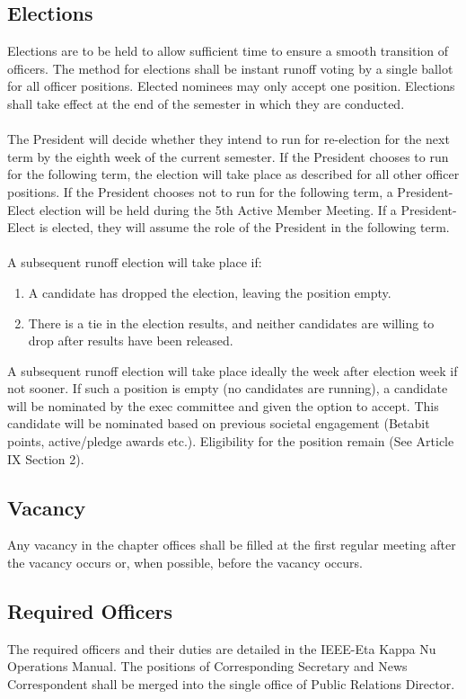 \documentclass[10pt, oneside]{article}
\begin{document}
\subsection{Elections}
Elections are to be held to allow sufficient time to ensure a smooth transition of officers. The method for elections shall be instant runoff voting by a single ballot for all officer positions. Elected nominees may only accept one position. Elections shall take effect at the end of the semester in which they are conducted.
\\~\\
The President will decide whether they intend to run for re-election for the next term by the eighth week of the current semester. If the President chooses to run for the following term, the election will take place as described for all other officer positions. If the President chooses not to run for the following term, a President-Elect election will be held during the 5th Active Member Meeting. If a President-Elect is elected, they will assume the role of the President in the following term.
\\~\\
A subsequent runoff election will take place if:
\begin{enumerate}[label=\alph*.]
\item A candidate has dropped the election, leaving the position empty.
\item There is a tie in the election results, and neither candidates are willing to drop after results have
been released.
\end{enumerate}
A subsequent runoff election will take place ideally the week after election week if not sooner. If such a position is empty (no candidates are running), a candidate will be nominated by the exec committee and given the option to accept. This candidate will be nominated based on previous societal engagement (Betabit points, active/pledge awards etc.). Eligibility for the position remain (See Article IX Section 2).
\subsection{Vacancy}
Any vacancy in the chapter offices shall be filled at the first regular meeting after the vacancy occurs or, when possible, before the vacancy occurs.
\subsection{Required Officers}
The required officers and their duties are detailed in the IEEE-Eta Kappa Nu Operations Manual. The positions of Corresponding Secretary and News Correspondent shall be merged into the single office of Public Relations Director.
\end{document}
